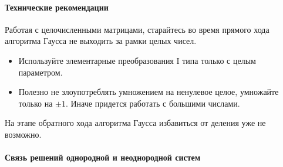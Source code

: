 \paragraph{Технические рекомендации}
Работая с целочисленными матрицами,  старайтесь во время прямого хода алгоритма Гаусса не выходить за рамки целых чисел. 
\begin{itemize}
\item Используйте элементарные преобразования I типа только с целым параметром. 
\item Полезно не злоупотреблять умножением на ненулевое целое, умножайте только на $\pm1$.
Иначе придется работать с большими числами.
\end{itemize}
На этапе обратного хода алгоритма Гаусса избавиться от деления уже не возможно.

\paragraph{Связь решений однородной и неоднородной систем}

